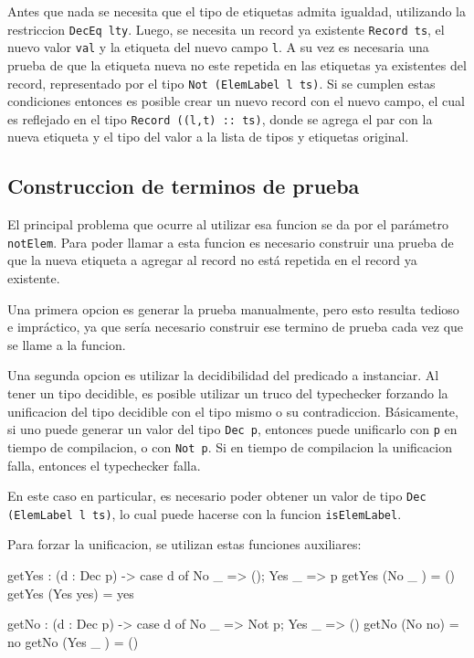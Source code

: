Antes que nada se necesita que el tipo de etiquetas admita igualdad, utilizando la restriccion \texttt{DecEq lty}. Luego, se necesita un record ya existente \texttt{Record ts}, el nuevo valor \texttt{val} y la etiqueta del nuevo campo \texttt{l}. A su vez es necesaria una prueba de que la etiqueta nueva no este repetida en las etiquetas ya existentes del record, representado por el tipo \texttt{Not (ElemLabel l ts)}. Si se cumplen estas condiciones entonces es posible crear un nuevo record con el nuevo campo, el cual es reflejado en el tipo \texttt{Record ((l,t) :: ts)}, donde se agrega el par con la nueva etiqueta y el tipo del valor a la lista de tipos y etiquetas original.

\subsection{Construccion de terminos de prueba}

El principal problema que ocurre al utilizar esa funcion se da por el parámetro \texttt{notElem}. Para poder llamar a esta funcion es necesario construir una prueba de que la nueva etiqueta a agregar al record no está repetida en el record ya existente.

Una primera opcion es generar la prueba manualmente, pero esto resulta tedioso e impráctico, ya que sería necesario construir ese termino de prueba cada vez que se llame a la funcion.

Una segunda opcion es utilizar la decidibilidad del predicado a instanciar. Al tener un tipo decidible, es posible utilizar un truco del typechecker forzando la unificacion del tipo decidible con el tipo mismo o su contradiccion.
Básicamente, si uno puede generar un valor del tipo \texttt{Dec p}, entonces puede unificarlo con \texttt{p} en tiempo de compilacion, o con \texttt{Not p}. Si en tiempo de compilacion la unificacion falla, entonces el typechecker falla.

En este caso en particular, es necesario poder obtener un valor de tipo \texttt{Dec (ElemLabel l ts)}, lo cual puede hacerse con la funcion \texttt{isElemLabel}.

Para forzar la unificacion, se utilizan estas funciones auxiliares:

\begin{code}
getYes : (d : Dec p) -> 
  case d of { No _ => (); Yes _ => p}
getYes (No _ ) = ()
getYes (Yes yes) = yes

getNo : (d : Dec p) -> 
  case d of { No _ => Not p; Yes _ => ()}
getNo (No no) = no
getNo (Yes _ ) = ()
\end{code}

